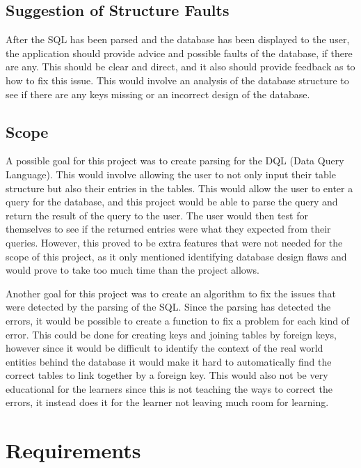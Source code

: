 \subsection{Suggestion of Structure Faults}

After the SQL has been parsed and the database has been displayed to the user, the application should provide advice and possible faults of the database, if there are any. This should be clear and direct, and it also should provide feedback as to how to fix this issue. This would involve an analysis of the database structure to see if there are any keys missing or an incorrect design of the database.

\subsection{Scope}

A possible goal for this project was to create parsing for the DQL (Data Query Language). This would involve allowing the user to not only input their table structure but also their entries in the tables. This would allow the user to enter a query for the database, and this project would be able to parse the query and return the result of the query to the user. The user would then test for themselves to see if the returned entries were what they expected from their queries. However, this proved to be extra features that were not needed for the scope of this project, as it only mentioned identifying database design flaws and would prove to take too much time than the project allows.

Another goal for this project was to create an algorithm to fix the issues that were detected by the parsing of the SQL. Since the parsing has detected the errors, it would be possible to create a function to fix a problem for each kind of error. This could be done for creating keys and joining tables by foreign keys, however since it would be difficult to identify the context of the real world entities behind the database it would make it hard to automatically find the correct tables to link together by a foreign key. This would also not be very educational for the learners since this is not teaching the ways to correct the errors, it instead does it for the learner not leaving much room for learning. 

\section{Requirements}

